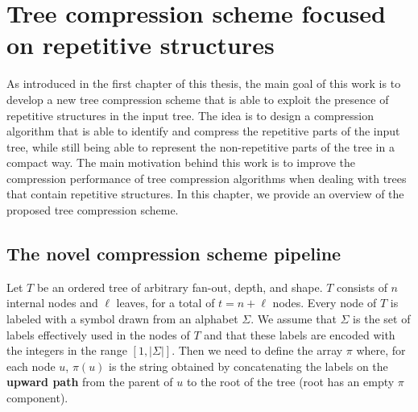 \chapter{Tree compression scheme focused on repetitive structures} \label{chp:project_overview}
As introduced in the first chapter of this thesis, the main goal of this work is to develop a new tree compression scheme that is able to exploit the presence of repetitive structures in the input tree. The idea is to design a compression algorithm that is able to identify and compress the repetitive parts of the input tree, while still being able to represent the non-repetitive parts of the tree in a compact way. The main motivation behind this work is to improve the compression performance of tree compression algorithms when dealing with trees that contain repetitive structures. In this chapter, we provide an overview of the proposed tree compression scheme.

\section{The novel compression scheme pipeline}
Let $ T $ be an ordered tree of arbitrary fan-out, depth, and shape. $ T $ consists of $ n $ internal nodes and $ \ell $ leaves, for a total of $ t = n + \ell $ nodes. Every node of $ T $ is labeled with a symbol drawn from an alphabet $ \Sigma $. We assume that $ \Sigma $ is the set of labels effectively used in the nodes of $T$ and that these labels are encoded with the integers in the range $[1, |\Sigma|]$. Then we need to define the array $\pi$ where, for each node $u$, $\pi(u)$ is the string obtained by concatenating the labels on the \textbf{upward path} from the parent of $u$ to the root of the tree (root has an empty $\pi$ component).

